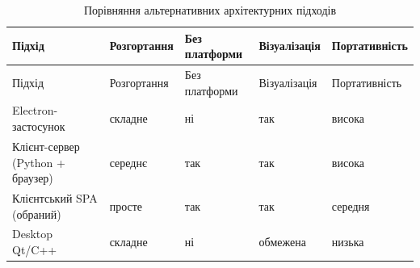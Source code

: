 \begin{longtable}[]{@{}
  >{\raggedright\arraybackslash}p{}
  >{\raggedright\arraybackslash}p{}
  >{\raggedright\arraybackslash}p{}
  >{\raggedright\arraybackslash}p{}
  >{\raggedright\arraybackslash}p{}@{}}
\caption[Порівняння архітектурних підходів]{Порівняння альтернативних
архітектурних підходів}\tabularnewline
\toprule\noalign{}
\begin{minipage}[b]{\linewidth}\raggedright
Підхід
\end{minipage} & \begin{minipage}[b]{\linewidth}\raggedright
Розгортання
\end{minipage} & \begin{minipage}[b]{\linewidth}\raggedright
Без платформи
\end{minipage} & \begin{minipage}[b]{\linewidth}\raggedright
Візуалізація
\end{minipage} & \begin{minipage}[b]{\linewidth}\raggedright
Портативність
\end{minipage} \\
\midrule\noalign{}
\endfirsthead
\toprule\noalign{}
\begin{minipage}[b]{\linewidth}\raggedright
Підхід
\end{minipage} & \begin{minipage}[b]{\linewidth}\raggedright
Розгортання
\end{minipage} & \begin{minipage}[b]{\linewidth}\raggedright
Без платформи
\end{minipage} & \begin{minipage}[b]{\linewidth}\raggedright
Візуалізація
\end{minipage} & \begin{minipage}[b]{\linewidth}\raggedright
Портативність
\end{minipage} \\
\midrule\noalign{}
\endhead
\bottomrule\noalign{}
\endlastfoot
Electron-застосунок & складне & ні & так & висока \\
Клієнт-сервер (Python + браузер) & середнє & так & так & висока \\
Клієнтський SPA (обраний) & просте & так & так & середня \\
Desktop Qt/C++ & складне & ні & обмежена & низька \\
\end{longtable}

